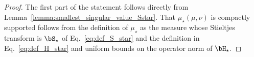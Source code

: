 \begin{proof}
  The first part of the statement follows directly from Lemma~\ref{lemma:smallest_singular_value_Sstar}.
  That $\mu_\star(\mu,\nu)$ is compactly supported follows from the definition of $\mu_\star$ as the measure whose Stieltjes transform is $\bS_\star$ of Eq.~\eqref{eq:def_S_star} and the definition in Eq.~\eqref{eq:def_H_star} and uniform bounds on the operator norm of $\bH_\star.$
\end{proof}

%





   





%





